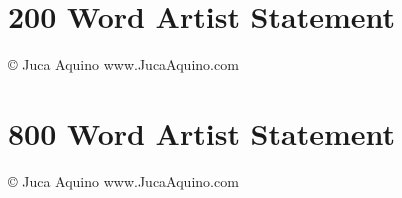 \documentclass[10pt]{article}
\begin{document}
\section*{200 Word Artist Statement} 

\vspace*{\fill}

\copyright{} \the\year{} Juca Aquino \hfill www.JucaAquino.com
\newpage
\section*{800 Word Artist Statement} 

\vspace*{\fill}

\copyright{} \the\year{} Juca Aquino \hfill www.JucaAquino.com
\end{document}
